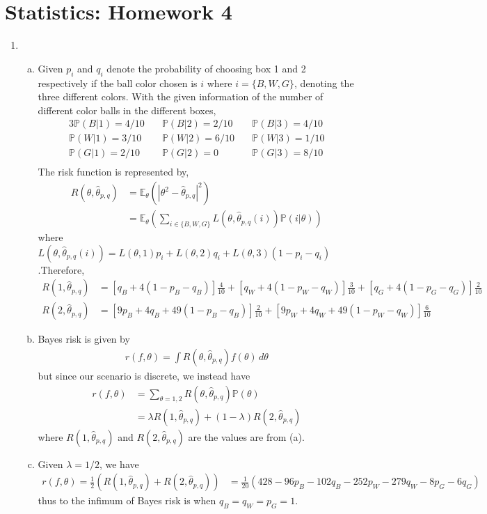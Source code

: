 \documentclass[a4paper,10pt]{article}
\theoremstyle{definition}
\begin{document}
\section*{Statistics: Homework 4}

\begin{enumerate}
\item 


\begin{enumerate}[(a)]
\item 
Given $p_i$ and $q_i$ denote the probability of choosing box 1 and 2 respectively if the ball color chosen is $i$ where $i=\{B, W ,G\}$, denoting the three different colors.  With the given information of the number of different color balls in the different boxes,
\begin{alignat*}{3}
\mathbb{P}(B|1)=4/10&\quad \mathbb{P}(B|2)=2/10&\quad \mathbb{P}(B|3)=4/10\\
\mathbb{P}(W|1)=3/10&\quad \mathbb{P}(W|2)=6/10&\quad \mathbb{P}(W|3)=1/10\\
\mathbb{P}(G|1)=2/10&\quad \mathbb{P}(G|2)=0&\quad \mathbb{P}(G|3)=8/10\\
\end{alignat*}
The risk function is represented by,
\begin{align*}
R(\theta,\hat{\theta}_{p,q}) &= \mathbb{E}_{\theta}(|\theta^2-\hat{\theta}_{p,q}|^2)\\
&=\mathbb{E}_{\theta}\left(\sum_{i\in\{B,W,G\}}L(\theta,\hat{\theta}_{p,q}(i))\mathbb{P}(i|\theta)\right)
\end{align*}
where $L(\theta,\hat{\theta}_{p,q}(i))=L(\theta,1)p_i+L(\theta,2)q_i+L(\theta,3)(1-p_i-q_i)$.Therefore,
\begin{align*}
R(1,\hat{\theta}_{p,q}) &= [q_B+4(1-p_B-q_B)]\frac{4}{10}+[q_W+4(1-p_W-q_W)]\frac{3}{10}+[q_G+4(1-p_G-q_G)]\frac{2}{10}\\
R(2,\hat{\theta}_{p,q}) &= [9p_B+4q_B+49(1-p_B-q_B)]\frac{2}{10}+[9p_W+4q_W+49(1-p_W-q_W)]\frac{6}{10}%
\end{align*}
\item Bayes risk is given by
\begin{align*}
r(f,\theta)=\int R(\theta,\hat{\theta}_{p,q})f(\theta)\,d\theta
\end{align*}
but since our scenario is discrete, we instead have
\begin{align*}
r(f,\theta) &= \sum_{\theta=1,2}R(\theta,\hat{\theta}_{p,q})\mathbb{P}(\theta)\\
&= \lambda R(1,\hat{\theta}_{p,q})+ (1-\lambda)R(2,\hat{\theta}_{p,q})
\end{align*}
where $R(1,\hat{\theta}_{p,q})$ and $R(2,\hat{\theta}_{p,q})$ are the values are from (a).
\item Given $\lambda = 1/2$, we have
\begin{align*}
r(f,\theta)=\frac{1}{2} \left(R(1,\hat{\theta}_{p,q})+ R(2,\hat{\theta}_{p,q})\right) &=\frac{1}{20}\left(428-96p_B-102q_B-252p_W-279q_W-8p_G-6q_G\right)
\end{align*}
thus to the infimum of Bayes risk is when $q_B = q_W = p_G =1$.
\end{enumerate}


\end{enumerate}
\end{document}
